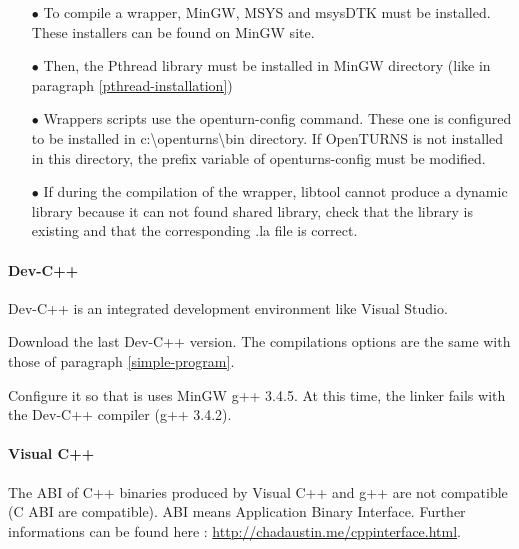 \begin{itemize}
\item[$\bullet$]   To compile a wrapper, MinGW, MSYS and msysDTK must be installed. These installers can be found on MinGW site.

\item[$\bullet$]   Then, the Pthread library must be installed in MinGW directory (like in paragraph \ref{pthread-installation})

\item[$\bullet$]   Wrappers scripts use the openturn-config command. These one is configured to be installed in c:\textbackslash openturns\textbackslash bin directory. If OpenTURNS is not installed in this directory, the prefix variable of openturns-config must be modified.
\item[$\bullet$]   If during the compilation of the wrapper, libtool cannot produce a dynamic library because it can not found shared library, check that the library is existing and that the corresponding .la file is correct.
\end{itemize}


\paragraph{Dev-C++}
Dev-C++ is an integrated development environment like Visual Studio.

Download the last Dev-C++ version.
The compilations options are the same with those of paragraph \ref{simple-program}.

Configure it so that is uses MinGW g++ 3.4.5. At this time, the linker fails with the Dev-C++ compiler (g++ 3.4.2).


\paragraph{Visual C++}

The ABI of C++ binaries produced by Visual C++ and g++ are not compatible (C ABI are compatible). ABI means Application Binary Interface.
Further informations can be found here : \url{http://chadaustin.me/cppinterface.html}.

